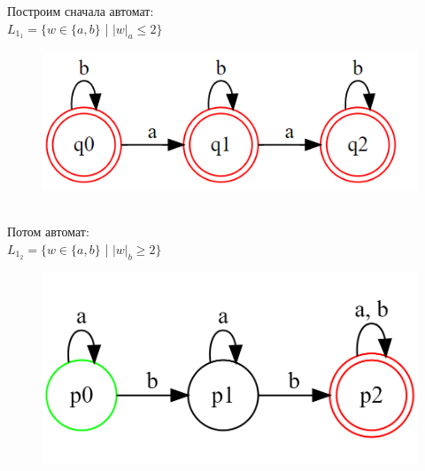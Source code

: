 \documentclass[a4paper]{article}
\begin{document}
\begin{enumerate}
Построим сначала автомат:\\
$L_1_1 = \{ w \in \{a,b\}  $ | $  {|w|_a} \le 2 \} $\\
\begin{figure}[h]
\centering
\includegraphics[width=12cm]{Задание_№1_1_2.png}
\end{figure}
\\Потом автомат:\\
$L_1_2 = \{ w \in \{a,b\}  $ | $  {|w|_b} \ge 2 \} $
\begin{figure}[h]
\centering
\includegraphics[width=12cm]{Задание_№2_1_1.png}
\end{figure}


\end{enumerate}
\end{document}
